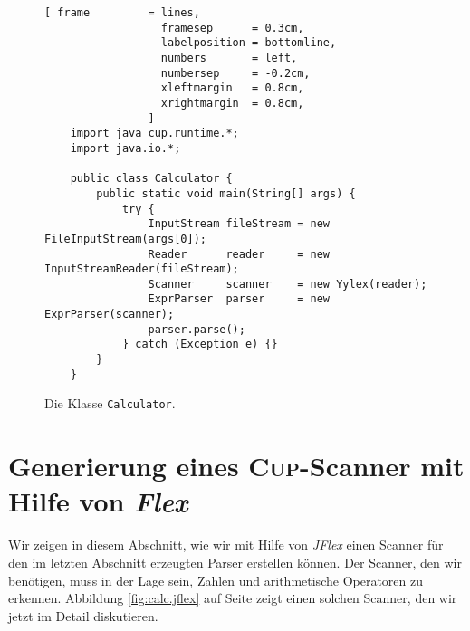 \begin{figure}[!ht]
\centering
\begin{Verbatim}[ frame         = lines, 
                  framesep      = 0.3cm, 
                  labelposition = bottomline,
                  numbers       = left,
                  numbersep     = -0.2cm,
                  xleftmargin   = 0.8cm,
                  xrightmargin  = 0.8cm,
                ]
    import java_cup.runtime.*;
    import java.io.*;
    
    public class Calculator {
        public static void main(String[] args) {
            try {
                InputStream fileStream = new FileInputStream(args[0]);
                Reader      reader     = new InputStreamReader(fileStream);
                Scanner     scanner    = new Yylex(reader);
                ExprParser  parser     = new ExprParser(scanner); 
                parser.parse(); 
            } catch (Exception e) {}
        }
    }
\end{Verbatim}
\vspace*{-0.3cm}
\caption{Die Klasse \texttt{Calculator}.}
\label{fig:Calculator.java}
\end{figure}
\vspace*{\fill}
\pagebreak

\vspace*{\fill}
\pagebreak


\section{Generierung eines \textsc{Cup}-Scanner mit Hilfe von \textsl{Flex}}
Wir zeigen in diesem Abschnitt, wie wir mit Hilfe von \textsl{JFlex} einen Scanner
f\"ur den im letzten Abschnitt erzeugten Parser erstellen k\"onnen.
Der Scanner, den wir ben\"otigen, muss in der Lage sein, Zahlen und arithmetische
Operatoren zu erkennen.  Abbildung \ref{fig:calc.jflex} auf Seite 
\pageref{fig:calc.jflex} zeigt einen solchen Scanner, den wir jetzt im Detail diskutieren.

